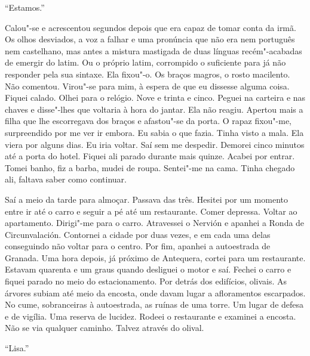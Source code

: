 ``Estamos.''

Calou"-se e acrescentou segundos depois que era capaz de tomar conta da
irmã. Os olhos desviados, a voz a falhar e uma pronúncia que
não era nem português nem castelhano, mas antes a mistura mastigada de
duas línguas recém"-acabadas de emergir do latim. Ou o próprio latim,
corrompido o suficiente para já não responder pela sua sintaxe. Ela
fixou"-o. Os braços magros, o rosto macilento. Não comentou. Virou"-se
para mim, à espera de que eu dissesse alguma coisa. Fiquei calado. Olhei
para o relógio. Nove e trinta e cinco. Peguei na carteira e nas chaves e
disse"-lhes que voltaria à hora do jantar. Ela não reagiu. Apertou mais
a filha que lhe escorregava dos braços e afastou"-se da porta. O rapaz
fixou"-me, surpreendido por me ver ir embora. Eu sabia o que fazia.
Tinha visto a mala. Ela viera por alguns dias. Eu iria voltar. Saí sem
me despedir. Demorei cinco minutos até a porta do hotel. Fiquei ali
parado durante mais quinze. Acabei por entrar. Tomei banho, fiz a barba,
mudei de roupa. Sentei"-me na cama. Tinha chegado ali, faltava saber
como continuar.

Saí a meio da tarde para almoçar. Passava das três. Hesitei por um
momento entre ir até o carro e seguir a pé até um restaurante. Comer
depressa. Voltar ao apartamento. Dirigi"-me para o carro. Atravessei o
Nervión e apanhei a Ronda de Circunvalación. Contornei a cidade
por duas vezes, e em cada uma delas conseguindo não voltar para o
centro. Por fim, apanhei a autoestrada de Granada. Uma hora depois, já
próximo de Antequera, cortei para um restaurante. Estavam quarenta e um
graus quando desliguei o motor e saí. Fechei o carro e fiquei parado no
meio do estacionamento. Por detrás dos edifícios, olivais. As árvores
subiam até meio da encosta, onde davam lugar a afloramentos escarpados.
No cume, sobranceiras à autoestrada, as ruínas de uma torre. Um lugar
de defesa e de vigília. Uma reserva de lucidez. Rodeei o restaurante e
examinei a encosta. Não se via qualquer caminho. Talvez através do
olival.

``Lisa.''

